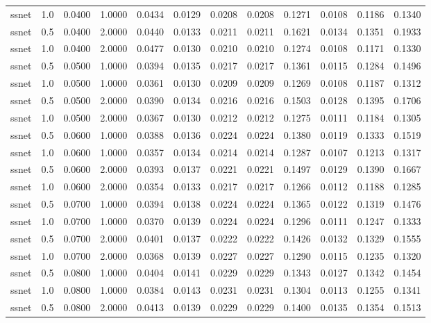 \documentclass[
]{article}
\begin{document}
\begin{longtable}[]{@{}lrrrrrrrrrrr@{}}
ssnet & 1.0 & 0.0400 & 1.0000 & 0.0434 & 0.0129 & 0.0208 & 0.0208 &
0.1271 & 0.0108 & 0.1186 & 0.1340 \\
ssnet & 0.5 & 0.0400 & 2.0000 & 0.0440 & 0.0133 & 0.0211 & 0.0211 &
0.1621 & 0.0134 & 0.1351 & 0.1933 \\
ssnet & 1.0 & 0.0400 & 2.0000 & 0.0477 & 0.0130 & 0.0210 & 0.0210 &
0.1274 & 0.0108 & 0.1171 & 0.1330 \\
ssnet & 0.5 & 0.0500 & 1.0000 & 0.0394 & 0.0135 & 0.0217 & 0.0217 &
0.1361 & 0.0115 & 0.1284 & 0.1496 \\
ssnet & 1.0 & 0.0500 & 1.0000 & 0.0361 & 0.0130 & 0.0209 & 0.0209 &
0.1269 & 0.0108 & 0.1187 & 0.1312 \\
ssnet & 0.5 & 0.0500 & 2.0000 & 0.0390 & 0.0134 & 0.0216 & 0.0216 &
0.1503 & 0.0128 & 0.1395 & 0.1706 \\
ssnet & 1.0 & 0.0500 & 2.0000 & 0.0367 & 0.0130 & 0.0212 & 0.0212 &
0.1275 & 0.0111 & 0.1184 & 0.1305 \\
ssnet & 0.5 & 0.0600 & 1.0000 & 0.0388 & 0.0136 & 0.0224 & 0.0224 &
0.1380 & 0.0119 & 0.1333 & 0.1519 \\
ssnet & 1.0 & 0.0600 & 1.0000 & 0.0357 & 0.0134 & 0.0214 & 0.0214 &
0.1287 & 0.0107 & 0.1213 & 0.1317 \\
ssnet & 0.5 & 0.0600 & 2.0000 & 0.0393 & 0.0137 & 0.0221 & 0.0221 &
0.1497 & 0.0129 & 0.1390 & 0.1667 \\
ssnet & 1.0 & 0.0600 & 2.0000 & 0.0354 & 0.0133 & 0.0217 & 0.0217 &
0.1266 & 0.0112 & 0.1188 & 0.1285 \\
ssnet & 0.5 & 0.0700 & 1.0000 & 0.0394 & 0.0138 & 0.0224 & 0.0224 &
0.1365 & 0.0122 & 0.1319 & 0.1476 \\
ssnet & 1.0 & 0.0700 & 1.0000 & 0.0370 & 0.0139 & 0.0224 & 0.0224 &
0.1296 & 0.0111 & 0.1247 & 0.1333 \\
ssnet & 0.5 & 0.0700 & 2.0000 & 0.0401 & 0.0137 & 0.0222 & 0.0222 &
0.1426 & 0.0132 & 0.1329 & 0.1555 \\
ssnet & 1.0 & 0.0700 & 2.0000 & 0.0368 & 0.0139 & 0.0227 & 0.0227 &
0.1290 & 0.0115 & 0.1235 & 0.1320 \\
ssnet & 0.5 & 0.0800 & 1.0000 & 0.0404 & 0.0141 & 0.0229 & 0.0229 &
0.1343 & 0.0127 & 0.1342 & 0.1454 \\
ssnet & 1.0 & 0.0800 & 1.0000 & 0.0384 & 0.0143 & 0.0231 & 0.0231 &
0.1304 & 0.0113 & 0.1255 & 0.1341 \\
ssnet & 0.5 & 0.0800 & 2.0000 & 0.0413 & 0.0139 & 0.0229 & 0.0229 &
0.1400 & 0.0135 & 0.1354 & 0.1513 \\

\end{longtable}
\end{document}

